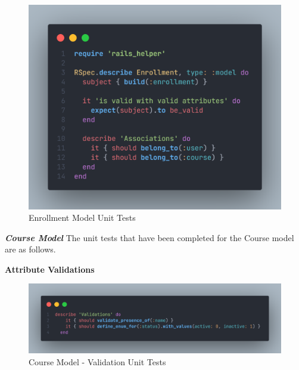 \begin{justify}
    \begin{figure}[H]
        \centerline{\includegraphics[width=140mm,scale=1]{figures/implementation_and_testing/testing/AUT/enrollment/all.png}}
        \caption{Enrollment Model Unit Tests}
        \label{Enrollment Model Unit Tests}
    \end{figure}




\newendline \textbf{\textit{Course Model}}\newendline
The unit tests that have been completed for the Course model are as follows.

\vspace{0.25cm}
\newendline
\textbf{Attribute Validations}

    \begin{figure}[H]
        \centerline{\includegraphics[width=140mm,scale=1]{figures/implementation_and_testing/testing/AUT/course/validations.png}}
        \caption{Course Model - Validation Unit Tests}
        \label{Course Model - Validation Unit Tests}
    \end{figure}


\end{justify}
